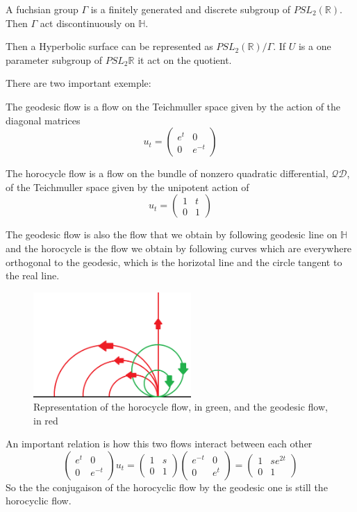 \begin{dfnt}
A fuchsian group $\Gamma$ is a finitely generated and discrete subgroup of $PSL_2(\mathbb{R})$. Then $\Gamma$ act discontinuously on $\mathbb{H}$.
\end{dfnt}

Then a Hyperbolic surface can be represented as $PSL_2(\mathbb{R})/ \Gamma$. If $U$ is a one parameter subgroup of $PSL_2{\mathbb{R}}$ it act on the quotient.

There are two important exemple:

\begin{dfnt}
The geodesic flow is a flow on the Teichmuller space given by the action of the diagonal matrices\[
u_t=\begin{pmatrix}
e^t & 0 \\
0 & e^{-t}
\end{pmatrix}
\]
\end{dfnt}

\begin{dfnt}
The horocycle flow is a flow on the bundle of nonzero quadratic differential, $\mathcal{QD}$, of the Teichmuller space given by the unipotent action of \[
u_t=\begin{pmatrix}
1 & t \\
0 & 1
\end{pmatrix}
\]
\end{dfnt}

The geodesic flow is also the flow that we obtain by following geodesic line on $\mathbb{H}$ and the horocycle is the flow we obtain by following curves which are everywhere orthogonal to the geodesic, which is the horizotal line and the circle tangent to the real line.

\begin{figure}[h!]
\centering
\includegraphics[width=6cm]{Image/FlowPaint.png}
\caption{Representation of the horocycle flow, in green, and the geodesic flow, in red}
\end{figure}


An important relation is how this two flows interact between each other \[
\begin{pmatrix} e^t & 0 \\ 0 & e^{-t}\end{pmatrix} u_t=\begin{pmatrix} 1 & s \\ 0 & 1 \end{pmatrix} \begin{pmatrix} e^{-t} & 0 \\ 0 & e^{t}\end{pmatrix}=
\begin{pmatrix} 1 & s e^{2t} \\ 0 & 1\end{pmatrix}
\]
So the the conjugaison of the horocyclic flow by the geodesic one is still the horocyclic flow.

